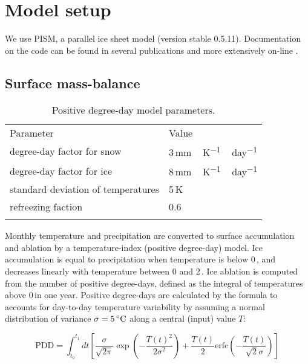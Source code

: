 
\section{Model setup}
\label{sec:model}

We use PISM, a parallel ice sheet model (version stable 0.5.11). Documentation on the code can be found in several publications \citep[e.g.,][]{bueler-brown-2009,winkelmann-etal-2011,aschwanden-etal-2012} and more extensively on-line \citep[{\url{http://www.pism-docs.org}},][]{web:pism}.

\subsection{Surface mass-balance}

\begin{table}[t]
	\caption{Positive degree-day model parameters.}
	\label{tab:pdd}
	\vskip4mm
	\centering
	\begin{tabular}{ll}
		\tophline
		Parameter& Value\\
		\middlehline
		degree-day factor for snow & 3\,\unit{mm\,K^{-1}\,day^{-1}}\\
		degree-day factor for ice & 8\,\unit{mm\,K^{-1}\,day^{-1}}\\
		standard deviation of temperatures & 5\,K\\
		refreezing faction & 0.6 \\
		\bottomhline
	\end{tabular}
\end{table}

Monthly temperature and precipitation are converted to surface accumulation and ablation by a temperature-index (positive degree-day) model. Ice accumulation is equal to precipitation when temperature is below 0\,\degC, and decreases linearly with temperature between 0 and 2\,\degC. Ice ablation is computed from the number of positive degree-days, defined as the integral of temperatures above 0\,\degC in one year. Positive degree-days are calculated by the \citet{calov-greve-2005} formula to accounts for day-to-day temperature variability by assuming a normal distribution of variance $\sigma=5\,\mathrm{^{\circ} C}$ along a central (input) value $T$:

\begin{equation}
	\mathrm{PDD} = \int_{t_0}^{t_1} dt \left[
		\frac{\sigma}{\sqrt{2\pi}}
		\exp\left({-\frac{T(t)^2}{2\sigma^2}}\right)
		+\frac{T(t)}{2}
		\mathrm{erfc} \left(-\frac{T(t)}{\sqrt{2}\sigma}\right)
	\right]
\end{equation}

